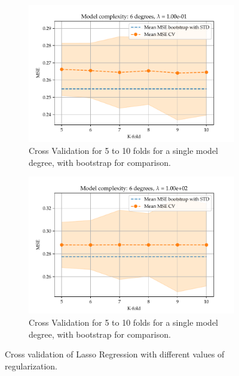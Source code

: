 \documentclass[11pt, a4paper]{article}
\begin{document}
\begin{figure}
\begin{subfigure}{0.49\textwidth}
    \includegraphics[width=\textwidth]{figures/EX5_lasso_mse_cv_boot26.pdf}
    \caption{\label{fig:mse_cv_lasso_3}Cross Validation for 5 to 10 folds for a single model degree, with bootstrap for comparison.}
  \end{subfigure}
  \hfill
  \begin{subfigure}{0.49\textwidth}
      \centering
      \includegraphics[width=\textwidth]{figures/EX5_lasso_mse_cv_boot36.pdf}
      \caption{\label{fig:mse_cv_lasso_4}Cross Validation for 5 to 10 folds for a single model degree, with bootstrap for comparison.}
  \end{subfigure}
  \caption{\label{sfig:lasso_cv_1}Cross validation of Lasso Regression with different values of regularization.}
\end{figure}
\end{document}
